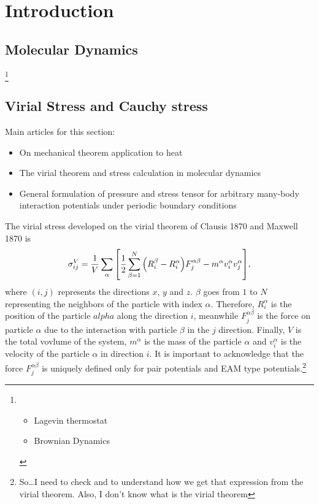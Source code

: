 \documentclass[../../main-notes.tex]{subfiles}
\begin{document}
\section{Introduction}

\subsection{Molecular Dynamics}\footnote{\begin{itemize}\item Lagevin thermostat \item Brownian Dynamics\end{itemize}}

\subsection{Virial Stress and Cauchy stress}


Main articles for this section:
\begin{itemize}
    \item On mechanical theorem application to heat
    \item The virial theorem and stress calculation in molecular dynamics 
    \item General formulation of pressure and stress tensor for arbitrary many-body interaction potentials under periodic boundary conditions
\end{itemize}

The virial stress developed on the virial theorem of Clausis 1870 and Maxwell 1870 is 
\begin{gather}
    \sigma_{ij}^V = \frac{1}{V}\sum_\alpha\qty[\frac{1}{2}\sum_{\beta=1}^N\qty(R_i^\beta-R^\alpha_i)F^{\alpha\beta}_j-m^\alpha v_i^\alpha v_j^\alpha]\label{eqn-mdStress},
\end{gather}
where $(i,j)$ represents the directions $x$, $y$ and $z$.
$\beta$ goes from $1$ to $N$ representing the neighbors of the particle with index $\alpha$.
Therefore, $R^\alpha_i$ is the position of the particle $alpha$ along the direction $i$, meanwhile $F^{\alpha\beta}_j$ is the force on particle $\alpha$ due to the interaction with particle $\beta$ in the $j$ direction.
Finally, $V$ is the total vovlume of the system, $m^\alpha$ is the mass of the particle $\alpha$ and $v^\alpha_i$ is the velocity of the particle $\alpha$ in direction $i$.
It is important to acknowledge that the force $F^{\alpha\beta}_j$ is uniquely defined only for pair potentials and EAM type potentials.\footnote{So\ldots I need to check\citep{Swenson_1983} and\citep{Tsai_1979} to understand how we get that expression from the virial theorem. Also, I don't know what is the virial theorem  }
\end{document}
